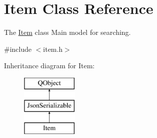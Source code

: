 \hypertarget{class_item}{}\section{Item Class Reference}
\label{class_item}


The \hyperlink{class_item}{Item} class Main model for searching.  




{\ttfamily \#include $<$item.\+h$>$}

Inheritance diagram for Item\+:\begin{figure}[H]
\begin{center}
\leavevmode
\includegraphics[height=3.000000cm]{class_item}
\end{center}
\end{figure}
